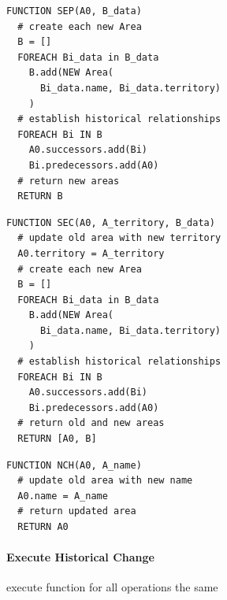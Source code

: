 \begin{minipage}[t]{0.47\textwidth}
\begin{lstlisting}[language=pseudocode,
  caption=Separation]
FUNCTION SEP(A0, B_data)
  # create each new Area
  B = []
  FOREACH Bi_data in B_data
    B.add(NEW Area(
      Bi_data.name, Bi_data.territory)
    )
  # establish historical relationships
  FOREACH Bi IN B
    A0.successors.add(Bi)
    Bi.predecessors.add(A0)
  # return new areas
  RETURN B

\end{lstlisting}
\end{minipage}    %
\hspace{3.5em}    %
\begin{minipage}[t]{0.47\textwidth}
\begin{lstlisting}[language=pseudocode,
  caption=Secession]
FUNCTION SEC(A0, A_territory, B_data)
  # update old area with new territory
  A0.territory = A_territory
  # create each new Area
  B = []
  FOREACH Bi_data in B_data
    B.add(NEW Area(
      Bi_data.name, Bi_data.territory)
    )
  # establish historical relationships
  FOREACH Bi IN B
    A0.successors.add(Bi)
    Bi.predecessors.add(A0)
  # return old and new areas
  RETURN [A0, B]

\end{lstlisting}
\end{minipage}

\vspace{-1.5em}
\begin{minipage}[t]{0.47\textwidth}
\begin{lstlisting}[language=pseudocode,
  caption=Name Change]
FUNCTION NCH(A0, A_name)
  # update old area with new name
  A0.name = A_name
  # return updated area
  RETURN A0

\end{lstlisting}
\end{minipage}



\paragraph{Execute Historical Change} %
\label{par:execute_historical_change}

execute function for all operations the same

